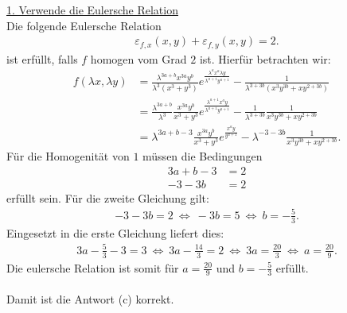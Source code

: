 \underline{1. Verwende die Eulersche Relation}\\
Die folgende Eulersche Relation 
\begin{align*}
	\varepsilon_{f,x}(x,y) + \varepsilon_{f,y}(x,y) 
	= 2.
\end{align*}
ist erfüllt, falls $f$ homogen vom Grad $2$ ist. Hierfür betrachten wir:
\begin{align*}
	f(\lambda x , \lambda y)
	&=
	\frac{\lambda^{3a + b} x^{3a} y^b}{\lambda^3 (x^3 + y^3)}
	e^{\frac{\lambda^a x^a \lambda y}{\lambda^{a+1} y^{a+1}}}
	-
	\frac{1}{
		\lambda^{3 + 3b}
		(
		x^3 y^{3b} + x y^{2+ 3b}
		)
	}\\
	&= 
	\frac{\lambda^{3a + b}}{\lambda^3}
	\frac{x^{3a} y^b}{x^3 + y^3} 	e^{\frac{\lambda^{a+1} x^a  y}{\lambda^{a+1} y^{a+1}}}
	-
	\frac{1}{\lambda^{3 + 3b}}
	\frac{1}{
		x^3 y^{3b} + x y^{2+ 3b}
	}\\
	&= 
	\lambda^{3a + b -3 }
	\frac{x^{3a} y^b}{x^3 + y^3} 
	e^{\frac{ x^a  y}{ y^{a+1}}}
	-
	\lambda^{-3 - 3b}
	\frac{1}{
		x^3 y^{3b} + x y^{2+ 3b}
	}.
\end{align*}
Für die Homogenität von $1$ müssen die Bedingungen
\begin{align*}
	3a + b - 3 &= 2\\
	-3 - 3b &= 2
\end{align*}
erfüllt sein. Für die zweite Gleichung gilt:
\begin{align*}
	-3 -3 b = 2  
	\ \Leftrightarrow \
	-3 b = 5
	\ \Leftrightarrow \
	b = - \frac{5}{3}.
\end{align*}
Eingesetzt in die erste Gleichung liefert dies:
\begin{align*}
	3a - \frac{5}{3}  -3 = 3
	\ \Leftrightarrow \
	3a - \frac{14}{3}  = 2 
	\ \Leftrightarrow \
	3a = \frac{20}{3}
	\ \Leftrightarrow \
	a  = \frac{20}{9}.
\end{align*}
Die eulersche Relation ist somit für $a  = \frac{20}{9}$ und $b = - \frac{5}{3}$ erfüllt.\\
\\
Damit ist die Antwort (c) korrekt.


